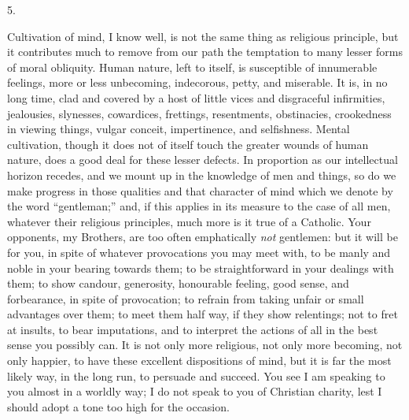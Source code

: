 5.

Cultivation of mind, I know well, is not the same
thing as religious principle, but it contributes much to
remove from our path the temptation to many lesser forms
of moral obliquity. Human nature, left to itself, is
susceptible of innumerable feelings, more or less
unbecoming, indecorous, petty, and miserable. It is, in
no long time, clad and covered by a host of little vices and disgraceful infirmities, jealousies, slynesses,
cowardices, frettings, resentments, obstinacies,
crookedness in viewing things, vulgar conceit,
impertinence, and selfishness. Mental cultivation, though
it does not of itself touch the greater wounds of human
nature, does a good deal for these lesser defects. In
proportion as our intellectual horizon recedes, and we
mount up in the knowledge of men and things, so do we
make progress in those qualities and that character of
mind which we denote by the word ``gentleman;''
and, if this applies in its measure to the case of all
men, whatever their religious principles, much more is it
true of a Catholic. Your opponents, my Brothers, are too
often emphatically \emph{not} gentlemen: but it will be
for you, in spite of whatever provocations you may meet
with, to be manly and noble in your bearing towards them;
to be straightforward in your dealings with them; to show
candour, generosity, honourable feeling, good sense, and
forbearance, in spite of provocation; to refrain from
taking unfair or small advantages over them; to meet them
half way, if they show relentings; not to fret at
insults, to bear imputations, and to interpret the
actions of all in the best sense you possibly can. It is
not only more religious, not only more becoming, not only
happier, to have these excellent dispositions of mind,
but it is far the most likely way, in the long run, to
persuade and succeed. You see I am speaking to you almost
in a worldly way; I do not speak to you of Christian
charity, lest I should adopt a tone too high for the
occasion.

